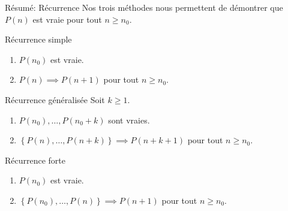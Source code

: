 \documentclass[a4paper]{article}
\begin{document}
\begin{parag}{Résumé: Récurrence}
    Nos trois méthodes nous permettent de démontrer que $P\left(n\right)$ est vraie pour tout $n \geq n_0$.

    \begin{subparag}{Récurrence simple}
        \begin{enumerate}[left=0pt]
            \item $P\left(n_0\right)$ est vraie.
            \item $P\left(n\right) \implies P\left(n+1\right)$ pour tout $n \geq n_0$.
        \end{enumerate}
    \end{subparag}

    \begin{subparag}{Récurrence généralisée}
        Soit $k \geq 1$.
        \begin{enumerate}[left=0pt]
            \item $P\left(n_0\right), \ldots, P\left(n_0 + k\right)$ sont vraies.
            \item $\left\{P\left(n\right), \ldots, P\left(n+k\right)\right\} \implies P\left(n+k+1\right)$ pour tout $n \geq n_0$.
        \end{enumerate}
    \end{subparag}

    \begin{subparag}{Récurrence forte}
        \begin{enumerate}[left=0pt]
            \item $P\left(n_0\right)$ est vraie.
            \item $\left\{P\left(n_0\right), \ldots, P\left(n\right)\right\} \implies P\left(n+1\right)$ pour tout $n \geq n_0$.
        \end{enumerate}
    \end{subparag}
\end{parag}
\end{document}
